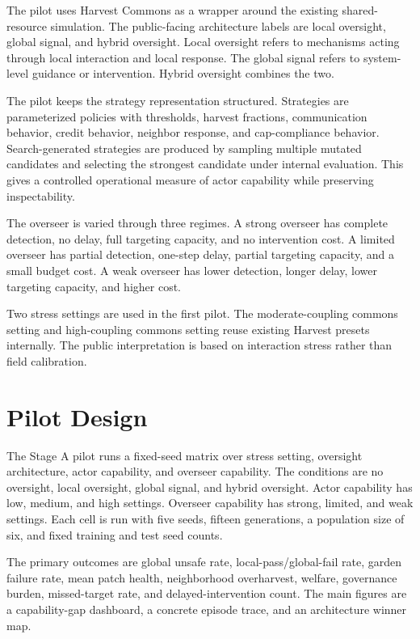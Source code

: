 \documentclass[11pt]{article}
\begin{document}
The pilot uses Harvest Commons as a wrapper around the existing shared-resource simulation. The public-facing architecture labels are local oversight, global signal, and hybrid oversight. Local oversight refers to mechanisms acting through local interaction and local response. The global signal refers to system-level guidance or intervention. Hybrid oversight combines the two.

The pilot keeps the strategy representation structured. Strategies are parameterized policies with thresholds, harvest fractions, communication behavior, credit behavior, neighbor response, and cap-compliance behavior. Search-generated strategies are produced by sampling multiple mutated candidates and selecting the strongest candidate under internal evaluation. This gives a controlled operational measure of actor capability while preserving inspectability.

The overseer is varied through three regimes. A strong overseer has complete detection, no delay, full targeting capacity, and no intervention cost. A limited overseer has partial detection, one-step delay, partial targeting capacity, and a small budget cost. A weak overseer has lower detection, longer delay, lower targeting capacity, and higher cost.

Two stress settings are used in the first pilot. The moderate-coupling commons setting and high-coupling commons setting reuse existing Harvest presets internally. The public interpretation is based on interaction stress rather than field calibration.

\section{Pilot Design}

The Stage A pilot runs a fixed-seed matrix over stress setting, oversight architecture, actor capability, and overseer capability. The conditions are no oversight, local oversight, global signal, and hybrid oversight. Actor capability has low, medium, and high settings. Overseer capability has strong, limited, and weak settings. Each cell is run with five seeds, fifteen generations, a population size of six, and fixed training and test seed counts.

The primary outcomes are global unsafe rate, local-pass/global-fail rate, garden failure rate, mean patch health, neighborhood overharvest, welfare, governance burden, missed-target rate, and delayed-intervention count. The main figures are a capability-gap dashboard, a concrete episode trace, and an architecture winner map.
\end{document}
